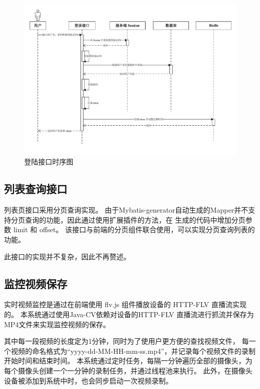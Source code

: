 \begin{figure}[ht]
    \centering
    \includegraphics[width=1\linewidth]{./Figure/IMG_login_seq.pdf}
    \caption{登陆接口时序图}\label{Fig:login_seq}
\end{figure}

\subsection{列表查询接口}
列表页接口采用分页查询实现。
由于Mybatis-generator自动生成的Mapper并不支持分页查询的功能，因此通过使用扩展插件的方法，在
生成的代码中增加分页参数 limit 和 offset。
该接口与前端的分页组件联合使用，可以实现分页查询列表的功能。

此接口的实现并不复杂，因此不再赘述。

\subsection{监控视频保存}
实时视频监控是通过在前端使用 flv.js 组件播放设备的 HTTP-FLV 直播流实现的。
本系统通过使用Java-CV依赖对设备的HTTP-FLV 直播流进行抓流并保存为MP4文件来实现监控视频的保存。

其中每一段视频的长度定为1分钟，同时为了使用户更方便的查找视频文件，
每一个视频的命名格式为“yyyy-dd-MM-HH-mm-ss.mp4”，并记录每个视频文件的录制开始时间和结束时间。
本系统通过定时任务，每隔一分钟遍历全部的摄像头，为每个摄像头创建一个一分钟的录制任务，并通过线程池来执行。
此外，在摄像头设备被添加到系统中时，也会同步启动一次视频录制。

